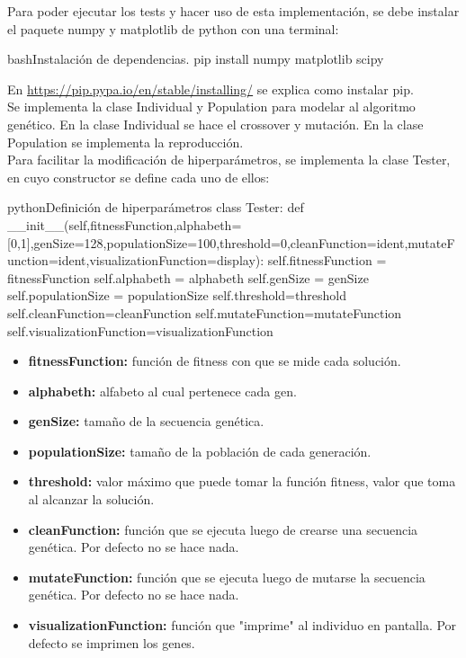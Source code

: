 \documentclass[letterpaper,11pt]{article} %
\begin{document}
Para poder ejecutar los tests y hacer uso de esta implementación, se debe instalar el paquete numpy y matplotlib de python con una terminal:

\begin{sourcecode}[\label{instalacion}]{bash}{Instalación de dependencias.}
pip install numpy matplotlib scipy
\end{sourcecode}

En \url{https://pip.pypa.io/en/stable/installing/} se explica como instalar pip.\\

Se implementa la clase Individual y Population para modelar al algoritmo genético. En la clase Individual se hace el crossover y mutación. En la clase Population se implementa la reproducción.\\

Para facilitar la modificación de hiperparámetros, se implementa la clase Tester, en cuyo constructor se define cada uno de ellos:\\

\begin{sourcecode}[\label{hiperparametros}]{python}{Definición de hiperparámetros}
class Tester:
    def __init__(self,fitnessFunction,alphabeth=[0,1],genSize=128,populationSize=100,threshold=0,cleanFunction=ident,mutateFunction=ident,visualizationFunction=display):
        self.fitnessFunction = fitnessFunction
        self.alphabeth = alphabeth
        self.genSize = genSize
        self.populationSize = populationSize
        self.threshold=threshold
        self.cleanFunction=cleanFunction
        self.mutateFunction=mutateFunction
        self.visualizationFunction=visualizationFunction
\end{sourcecode}

\begin{itemize}
\item \textbf{fitnessFunction:} función de fitness con que se mide cada solución.
\item \textbf{alphabeth:} alfabeto al cual pertenece cada gen.
\item \textbf{genSize:} tamaño de la secuencia genética.
\item \textbf{populationSize:} tamaño de la población de cada generación.
\item \textbf{threshold:} valor máximo que puede tomar la función fitness, valor que toma al alcanzar la solución.
\item \textbf{cleanFunction:} función que se ejecuta luego de crearse una secuencia genética. Por defecto no se hace nada.
\item \textbf{mutateFunction:} función que se ejecuta luego de mutarse la secuencia genética. Por defecto no se hace nada.
\item \textbf{visualizationFunction:} función que "imprime" al individuo en pantalla. Por defecto se imprimen los genes.
\end{itemize}
\end{document}
